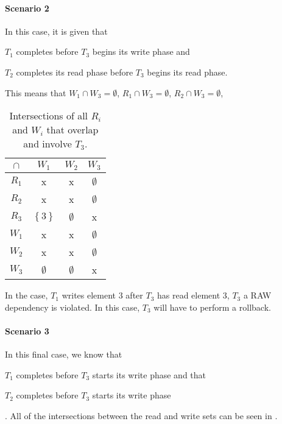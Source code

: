 \documentclass[11pt,a4paper,english]{article}
\begin{document}
\paragraph{Scenario 2} In this case, it is given that \begin{inparaenum}[1]
\item $T_{1}$ completes before $T_{3}$ begins its write phase and \item $T_{2}$
  completes its read phase before $T_{3}$ begins its read phase.\end{inparaenum} This means that
$W_{1} \cap W_{3} = \emptyset$, $R_{1} \cap W_{3} = \emptyset$,
$R_{2} \cap W_{3} = \emptyset$,
\begin{table}[!hbt]
\centering
\begin{tabular}{|c|c|c|c|}
\hline
$\cap$  & $W_{1}$ & $W_{2}$ & $W_{3}$    \\ \hline
$R_{1}$ & x  & x  & $\emptyset$ \\ \hline
$R_{2}$ & x  & x  & $\emptyset$ \\ \hline
$R_{3}$ & $\left\{ 3 \right\}$ & $\emptyset$ & x \\ \hline
$W_{1}$ & x  & x  & $\emptyset$ \\ \hline
$W_{2}$ & x  & x  & $\emptyset$ \\ \hline
$W_{3}$ & $\emptyset$ & $\emptyset$ & x \\ \hline
\end{tabular}
\caption{Intersections of all $R_{i}$ and $W_{i}$ that overlap and involve $T_{3}$.}
\label{tbl:scenario1}
\end{table}

In the case, $T_{1}$ writes element $3$ after $T_{3}$ has read element $3$,
$T_{3}$ a RAW dependency is violated. In this case, $T_{3}$ will have to perform a rollback.

\paragraph{Scenario 3}
In this final case, we know that \begin{inparaenum}[1)] \item $T_1$ completes before
  $T_3$ starts its write phase and that \item $T_2$ completes before $T_3$
  starts its write phase \end{inparaenum}. All of the intersections between the
read and write sets can be seen in .
\end{document}
